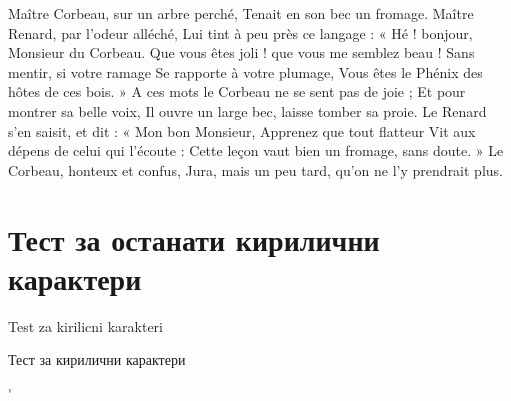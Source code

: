\documentclass[a4paper]{report}
\begin{document}
Maître Corbeau, sur un arbre perché,
Tenait en son bec un fromage.
Maître Renard, par l’odeur alléché,
Lui tint à peu près ce langage :
« Hé ! bonjour, Monsieur du Corbeau.
Que vous êtes joli ! que vous me semblez beau !
Sans mentir, si votre ramage
Se rapporte à votre plumage,
Vous êtes le Phénix des hôtes de ces bois. »
A ces mots le Corbeau ne se sent pas de joie ;
Et pour montrer sa belle voix,
Il ouvre un large bec, laisse tomber sa proie.
Le Renard s’en saisit, et dit : « Mon bon Monsieur,
Apprenez que tout flatteur
Vit aux dépens de celui qui l'écoute :
Cette leçon vaut bien un fromage, sans doute. »
Le Corbeau, honteux et confus,
Jura, mais un peu tard, qu’on ne l’y prendrait plus.


\section{Тест за останати кирилични карактери}

Test za kirilicni karakteri

Тест за кирилични карактери

\CYRG

\cyrzh

\'{\CYRG}

\CYRISHRT

\CYRJE

\CYRCH

\CYRDZHE

\CYRSH

\CYRNJE

\CYRLJE

\CYRDZE

\abstractname

\contentsname








  
  \clearpage
  
    \prefacename
    
   \alsoname\\
    \seename\\
    
   
   \listoffigures
   \listoftables
 \printindex
    
\end{document}
